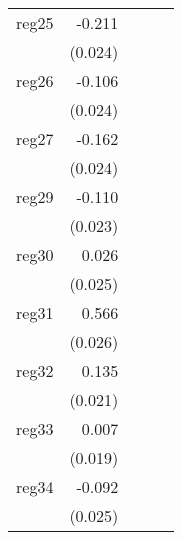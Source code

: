 {\begin{longtable}{l*{4}{D{.}{.}{-1}}}
\addlinespace
reg25       &      -0.211\sym{***}&                     &                     &                     \\
            &     (0.024)         &                     &                     &                     \\
\addlinespace
reg26       &      -0.106\sym{***}&                     &                     &                     \\
            &     (0.024)         &                     &                     &                     \\
\addlinespace
reg27       &      -0.162\sym{***}&                     &                     &                     \\
            &     (0.024)         &                     &                     &                     \\
\addlinespace
reg29       &      -0.110\sym{***}&                     &                     &                     \\
            &     (0.023)         &                     &                     &                     \\
\addlinespace
reg30       &       0.026         &                     &                     &                     \\
            &     (0.025)         &                     &                     &                     \\
\addlinespace
reg31       &       0.566\sym{***}&                     &                     &                     \\
            &     (0.026)         &                     &                     &                     \\
\addlinespace
reg32       &       0.135\sym{***}&                     &                     &                     \\
            &     (0.021)         &                     &                     &                     \\
\addlinespace
reg33       &       0.007         &                     &                     &                     \\
            &     (0.019)         &                     &                     &                     \\
\addlinespace
reg34       &      -0.092\sym{***}&                     &                     &                     \\
            &     (0.025)         &                     &                     &                     \\

\end{longtable}}
